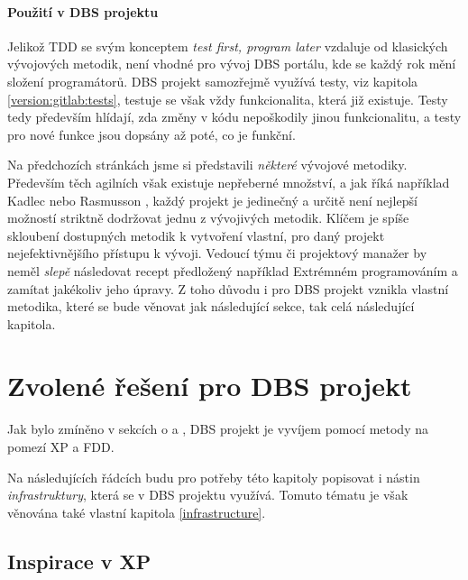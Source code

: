 \paragraph{Použití v DBS projektu}
Jelikož TDD se svým konceptem \emph{test first, program later} vzdaluje od klasických vývojových metodik, není vhodné pro vývoj DBS portálu, kde se každý rok mění složení programátorů. DBS projekt samozřejmě využívá testy, viz kapitola \ref{version:gitlab:tests}, testuje se však vždy funkcionalita, která již existuje. Testy tedy především hlídají, zda změny v kódu nepoškodily jinou funkcionalitu, a testy pro nové funkce jsou dopsány až poté, co je funkční.



Na předchozích stránkách jsme si představili \emph{některé} vývojové metodiky. Především těch agilních však existuje nepřeberné množství, a jak říká například Kadlec \cite{kadlec} nebo Rasmusson \cite{rasmusson}, každý projekt je jedinečný a určitě není nejlepší možností striktně dodržovat jednu z vývojivých metodik. Klíčem je spíše skloubení dostupných metodik k vytvoření vlastní, pro daný projekt nejefektivnějšího přístupu k vývoji. Vedoucí týmu či projektový manažer by neměl \emph{slepě} následovat recept předložený například Extrémném programováním a zamítat jakékoliv jeho úpravy. Z toho důvodu i pro DBS projekt vznikla vlastní metodika, které se bude věnovat jak následující sekce, tak celá následující kapitola.


\section{Zvolené řešení pro DBS projekt} \label{methods:dbs}

Jak bylo zmíněno v sekcích o \emph{} a \emph{}, DBS projekt je vyvíjem pomocí metody na pomezí XP a FDD.

Na následujících řádcích budu pro potřeby této kapitoly popisovat i nástin \emph{infrastruktury}, která se v DBS projektu využívá. Tomuto tématu je však věnována také vlastní kapitola \ref{infrastructure}.


\subsection{Inspirace v XP}

